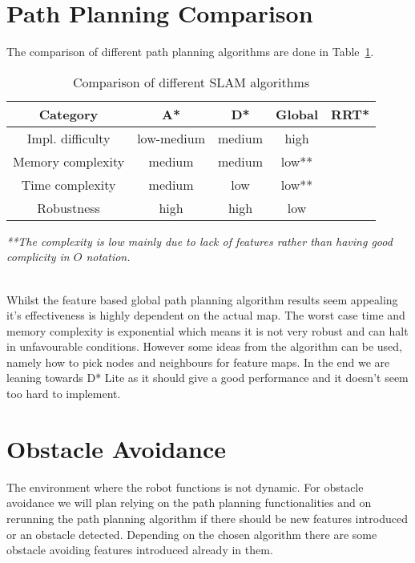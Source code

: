 \documentclass[12pt, a4paper, onecolumn]{article}
\begin{document}
\section{Path Planning Comparison}
The comparison of different path planning algorithms are done in 
Table~\ref{tab:path_algorithms}.
\begin{table}[h!]
  \begin{center}
    \begin{tabular}[c]{|c || c c c c |}
      \hline
       Category        &  A*            & D*      & Global & RRT*    \\
      \hline
      Impl. difficulty & low-medium     & medium  & high &\\
      \hline
      Memory complexity & medium        & medium  & low** &\\
      \hline
      Time complexity  & medium         & low     & low** &\\
      \hline
      Robustness       & high           & high    & low  &\\
      \hline
    \end{tabular}
  \end{center}
  \textit{**The complexity is low mainly due to lack of features rather than having good complicity in $O$ notation.}
  \caption{Comparison of different SLAM algorithms}
  \label{tab:path_algorithms}
\end{table} \\


Whilst the feature based global path planning algorithm results seem appealing it's effectiveness is highly dependent on the actual map.
The worst case time and memory complexity is exponential which means it is not very robust and can halt in unfavourable conditions.
However some ideas from the algorithm can be used, namely how to pick nodes and neighbours for feature maps.
In the end we are leaning towards D* Lite as it should give a good performance and it doesn't seem too hard to implement.

\section{Obstacle Avoidance }

The environment where the robot functions is not dynamic. For obstacle avoidance we will plan relying on the path planning functionalities and on rerunning the path planning algorithm if there should be new features introduced or an obstacle detected. Depending on the chosen algorithm there are some obstacle avoiding features introduced already in them. 
\end{document}
